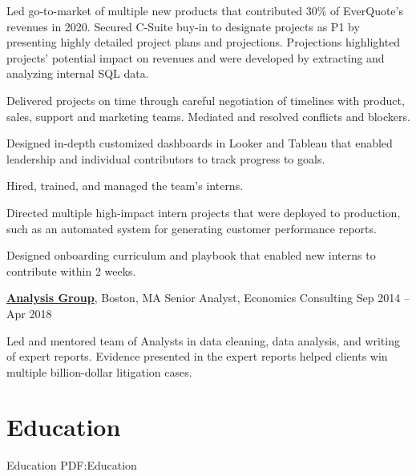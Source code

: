 \documentclass[letterpaper,10pt,oneside]{article}
\begin{document}
\begin{body}
\begin{flushleft}
\BulletItem Led go-to-market of multiple new products that contributed 30\% of EverQuote's revenues in 2020.
\vspace{0.5em} \SubBulletItem Secured C-Suite buy-in to designate projects as P1 by presenting highly detailed project plans and projections. Projections highlighted projects' potential impact on revenues and were developed by extracting and analyzing internal SQL data.

\vspace{0.5em} \SubBulletItem Delivered projects on time through careful negotiation of timelines with product, sales, support and marketing teams. Mediated and resolved conflicts and blockers. 

\vspace{0.5em} \SubBulletItem Designed in-depth customized dashboards in Looker and Tableau that enabled leadership and individual contributors to track progress to goals. 

\vspace{0.75em}
\BulletItem Hired, trained, and managed the team's interns. 

\vspace{0.5em} \SubBulletItem Directed multiple high-impact intern projects that were deployed to production, such as an automated system for generating customer performance reports.

\vspace{0.5em} \SubBulletItem Designed onboarding curriculum and playbook that enabled new interns to contribute within 2 weeks. 

\end{flushleft}

\vspace{0.75em}
\href{http://www.analysisgroup.com/}
{\textbf{Analysis Group}},
Boston, MA
\GapNoBreak
Senior Analyst,
Economics Consulting
\hfill
Sep 2014 --
Apr 2018
\begin{flushleft}

\BulletItem Led and mentored team of Analysts in data cleaning, data analysis, and writing of expert reports. Evidence presented in the expert reports helped clients win multiple billion-dollar litigation cases.

\end{flushleft}


\section
{Education}
{Education}
{PDF:Education}


\end{body}
\end{document}
